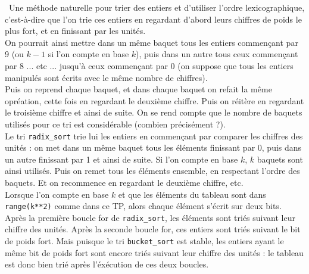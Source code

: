 \question\ Une méthode naturelle pour trier des entiers et d'utiliser l'ordre 
lexicographique, c'est-à-dire que l'on trie ces entiers en regardant d'abord 
leurs chiffres de poids le plus fort, et en finissant par les unités.\\
On pourrait ainsi mettre dans un même baquet tous les entiers commençant par 9 
(ou $k-1$ si l'on compte en base $k$), puis dans un autre tous ceux commençant 
par 8 ... etc ... jusqu'à ceux commençant par 0 (on suppose que tous les 
entiers manipulés sont écrits avec le même nombre de chiffres).\\
Puis on reprend chaque baquet, et dans chaque baquet on refait la même 
opréation, cette fois en regardant le deuxième chiffre. Puis on réitère en 
regardant le troisième chiffre et ainsi de suite. On se rend compte que le 
nombre de baquets utilisés pour ce tri est considérable (combien précisément 
?).\\
Le tri \verb|radix_sort| trie lui les entiers en commençant par comparer les 
chiffres des unités : on met dans un même baquet tous les éléments finissant 
par 0, puis dans un autre finissant par 1 et ainsi de suite. Si l'on compte en 
base $k$, $k$ baquets sont ainsi utilisés. Puis on remet tous les éléments 
ensemble, en respectant l'ordre des baquets. Et on recommence en regardant le 
deuxième chiffre, etc.\\

Lorsque l'on compte en base $k$ et que les éléments du tableau sont dans 
\verb|range(k**2)| comme dans ce TP, alors chaque élément s'écrit sur deux 
bits. Après la première boucle for de \verb|radix_sort|, les éléments sont 
triés suivant leur chiffre des unités. Après la seconde boucle for, ces entiers 
sont triés suivant le bit de poids fort. Mais puisque le tri \verb|bucket_sort| 
est stable, les entiers ayant le même bit de poids fort sont encore triés 
suivant leur chiffre des unités : le tableau est donc bien trié après 
l'éxécution de ces deux boucles.

\else
\fi
